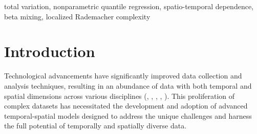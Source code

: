 \documentclass[twoside,11pt]{article}
\newcommand{\rev}[1]{{\color{revisionred}#1}}
\newenvironment{revision}{\color{revisionred}}{}
\begin{document}
\begin{abstract}
\begin{revision}
We study nonparametric conditional-quantile estimation for observations indexed by time and space. Observations collected at nearby times may be dependent, while observations at the same time share a time-specific random spatial effect. We analyze constrained empirical quantile-risk minimizers over bounded convex and nonconvex function classes. The theory allows heavy-tailed measurement errors and imposes no moment condition on the response noise. The main bound is expressed through a blockwise localized Rademacher fixed point and an additional term measuring the fluctuation induced by the random spatial effect. We specialize the framework to univariate trend filtering, high-dimensional linear quantile prediction, $K$-nearest-neighbor graph fused lasso, and clipped sparse ReLU networks for hierarchical composition models. For trend filtering, the usual minimax exponent is retained up to logarithmic factors and the spatial-effect term. We also provide ADMM algorithms and numerical studies under light- and heavy-tailed noise.
\end{revision}
\end{abstract}

\begin{keywords}
\rev{total variation, nonparametric quantile regression, spatio-temporal dependence, beta mixing, localized Rademacher complexity}
\end{keywords}

% 

\section{Introduction}


Technological advancements have significantly improved data collection and analysis techniques, resulting in an abundance of data with both temporal and spatial dimensions across various disciplines (\cite{wen2019novel}, \cite{briz2020spatio}, \cite{liu2020high}, \cite{tian2021assessing}, \cite{jayasiri2022spatio}). This proliferation of complex datasets has necessitated the development and adoption of advanced temporal-spatial models designed to address the unique challenges and harness the full potential of temporally and spatially diverse data.
\end{document}
